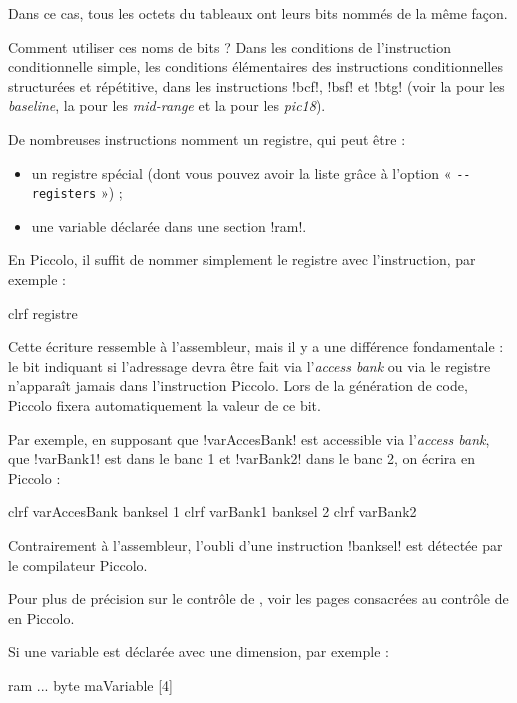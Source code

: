 Dans ce cas, tous les octets du tableaux ont leurs bits nommés de la même façon.

Comment utiliser ces noms de bits ? Dans les conditions de l'instruction conditionnelle simple, les conditions élémentaires des instructions conditionnelles structurées et répétitive, dans les instructions \pic!bcf!, \pic!bsf! et \pic!btg! (voir la  pour les \emph{baseline}, la  pour les \emph{mid-range} et la  pour les \emph{pic18}). 



De nombreuses instructions nomment un registre, qui peut être :
\begin{itemize}
  \item un registre spécial (dont vous pouvez avoir la liste grâce à l'option « \texttt{-{}-registers} ») ;
  \item une variable déclarée dans une section \pic!ram!.
\end{itemize}

En Piccolo, il suffit de nommer simplement le registre avec l'instruction, par exemple :
\begin{piccolo}
clrf registre
\end{piccolo}

Cette écriture ressemble à l'assembleur, mais il y a une différence fondamentale : le bit indiquant si l'adressage devra être fait via l'\emph{access bank} ou via le registre  n'apparaît jamais dans l'instruction Piccolo. Lors de la génération de code, Piccolo fixera automatiquement la valeur de ce bit.

Par exemple, en supposant que \pic!varAccesBank! est accessible via l'\emph{access bank}, que \pic!varBank1! est dans le banc 1 et \pic!varBank2! dans le banc 2, on écrira en Piccolo :

\begin{piccolo}
clrf varAccesBank
banksel 1
clrf varBank1
banksel 2
clrf varBank2
\end{piccolo}

Contrairement à l'assembleur, l'oubli d'une instruction \pic!banksel! est détectée par le compilateur Piccolo.

Pour plus de précision sur le contrôle de , voir les pages consacrées au contrôle de  en Piccolo.

Si une variable est déclarée avec une dimension, par exemple :
\begin{piccolo}
ram ... { 
  byte maVariable [4]
}
\end{piccolo}

